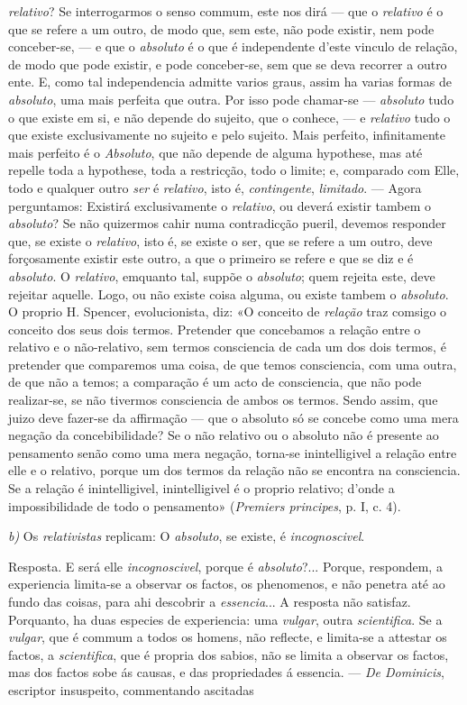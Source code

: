 \emph{relativo}? Se interrogarmos o senso commum, este nos dirá --- que o \emph{relativo} é o que se refere a um outro, de modo que, sem este, não pode existir, nem pode conceber-se, --- e que o \emph{absoluto} é o que é independente d'este vinculo de relação, de modo que pode existir, e pode conceber-se, sem que se deva recorrer a outro ente. E, como tal independencia admitte varios graus, assim ha varias formas de \emph{absoluto}, uma mais perfeita que outra. Por isso pode chamar-se --- \emph{absoluto} tudo o que existe em si, e não depende do sujeito, que o conhece, --- e \emph{relativo} tudo o que existe exclusivamente no sujeito e pelo sujeito. Mais perfeito, infinitamente mais perfeito é o \emph{Absoluto}, que não depende de alguma hypothese, mas até repelle toda a hypothese, toda a restricção, todo o limite; e, comparado com Elle, todo e qualquer outro \emph{ser} é \emph{relativo}, isto é, \emph{contingente}, \emph{limitado}. --- Agora perguntamos: Existirá exclusivamente o \emph{relativo}, ou deverá existir tambem o \emph{absoluto}? Se não quizermos cahir numa contradicção pueril, devemos responder que, se existe o \emph{relativo}, isto é, se existe o ser, que se refere a um outro, deve forçosamente existir este outro, a que o primeiro se refere e que se diz e é \emph{absoluto}. O \emph{relativo}, emquanto tal, suppõe o \emph{absoluto}; quem rejeita este, deve rejeitar aquelle. Logo, ou não existe coisa alguma, ou existe tambem o \emph{absoluto}. O proprio H. Spencer, evolucionista, diz: «O conceito de \emph{relação} traz comsigo o conceito dos seus dois termos. Pretender que concebamos a relação entre o relativo e o não-relativo, sem termos consciencia de cada um dos dois termos, é pretender que comparemos uma coisa, de que temos consciencia, com uma outra, de que não a temos; a comparação é um acto de consciencia, que não pode realizar-se, se não tivermos consciencia de ambos os termos. Sendo assim, que juizo deve fazer-se da affirmação --- que o absoluto só se concebe como uma mera negação da concebibilidade? Se o não relativo ou o absoluto não é presente ao pensamento senão como uma mera negação, torna-se inintelligivel a relação entre elle e o relativo, porque um dos termos da relação não se encontra na consciencia. Se a relação é inintelligivel, inintelligivel é o proprio relativo; d'onde a impossibilidade de todo o pensamento» (\emph{Premiers principes}, p. I, c. 4).\par \emph{b)} Os \emph{relativistas} replicam: O \emph{absoluto}, se existe, é \emph{incognoscivel}.\par Resposta. E será elle \emph{incognoscivel}, porque é \emph{absoluto}?... Porque, respondem, a experiencia limita-se a observar os factos, os phenomenos, e não penetra até ao fundo das coisas, para ahi descobrir a \emph{essencia}... A resposta não satisfaz. Porquanto, ha duas especies de experiencia: uma \emph{vulgar}, outra \emph{scientifica}. Se a \emph{vulgar}, que é commum a todos os homens, não reflecte, e limita-se a attestar os factos, a \emph{scientifica}, que é propria dos sabios, não se limita a observar os factos, mas dos factos sobe ás causas, e das propriedades á essencia. --- \emph{De Dominicis}, escriptor insuspeito, commentando ascitadas 
